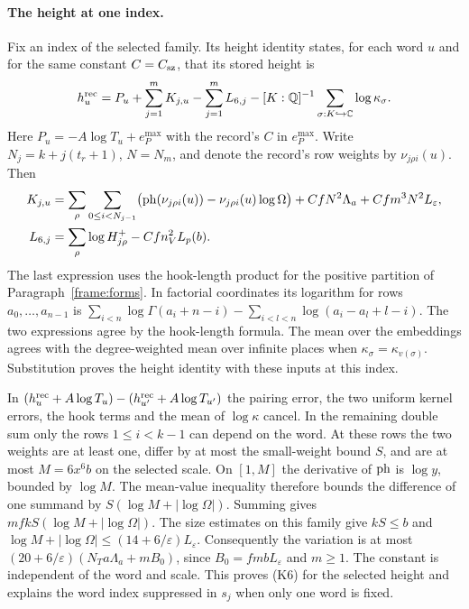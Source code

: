 \paragraph{The height at one index.}\label{assembly:wordheight}
Fix an index of the selected family. Its height identity states, for
each word $u$ and for the same constant $C=C_{\rm sz}$, that its
stored height is
\[
 h^{\rm rec}_u=P_u+\sum_{j=1}^m K_{j,u}
             -\sum_{j=1}^m L_{6,j}
             -[K:\mathbb Q]^{-1}\sum_{\sigma:K\hookrightarrow\mathbb C}
                  \log\kappa_\sigma .
\]
Here $P_u=-A\log T_u+e_P^{\max}$ with the record's $C$ in
$e_P^{\max}$. Write $N_j=k+j(t_r+1)$, $N=N_m$, and denote the
record's row weights by $\nu_{j\rho i}(u)$. Then
\begin{align*}
 K_{j,u}
   &=\sum_\rho\sum_{0\le i<N_{j-1}}
       \bigl(\operatorname{ph}(\nu_{j\rho i}(u))-\nu_{j\rho i}(u)\log\Omega\bigr)
       +CfN^2\Lambda_a+Cfm^3N^2L_\varepsilon,\\
 L_{6,j}
   &=\sum_\rho\log H^+_{j\rho}-Cfn_V^2 L_p(b).
\end{align*}
The last expression uses the hook-length product for the positive
partition of Paragraph~\ref{frame:forms}. In factorial coordinates its
logarithm for rows $a_0,\ldots,a_{n-1}$ is
$\sum_{i<n}\log\Gamma(a_i+n-i)-
\sum_{i<l<n}\log(a_i-a_l+l-i)$. The two expressions agree by the
hook-length formula. The mean over the embeddings agrees with the
degree-weighted mean over infinite places when
$\kappa_\sigma=\kappa_{v(\sigma)}$. Substitution proves the height
identity with these inputs at this index.

In $(h^{\rm rec}_u+A\log T_u)-(h^{\rm rec}_{u'}+A\log T_{u'})$
the pairing error, the two uniform kernel errors, the hook terms and
the mean of $\log\kappa$ cancel. In the remaining double sum only
the rows $1\le i<k-1$ can depend on the word. At these rows the two
weights are at least one, differ by at most the small-weight bound
$S$, and are at most $M=6x^6b$ on the selected scale. On $[1,M]$ the
derivative of $\operatorname{ph}$ is $\log y$, bounded by $\log M$. The mean-value
inequality therefore bounds the difference of one summand by
$S(\log M+|\log\Omega|)$. Summing gives
$mfkS(\log M+|\log\Omega|)$. The size estimates on this family give
$kS\le b$ and
$\log M+|\log\Omega|\le(14+6/\varepsilon)L_\varepsilon$.
Consequently the variation is at most
$(20+6/\varepsilon)(N_Ta\Lambda_a+mB_0)$, since
$B_0=fmbL_\varepsilon$ and $m\ge1$. The constant is independent of
the word and scale. This proves (K6) for the selected height and
explains the word index suppressed in $s_j$ when only one word is fixed.

